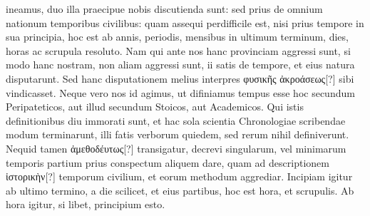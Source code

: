 ineamus, duo illa praecipue nobis discutienda sunt: sed prius
de omnium nationum temporibus civilibus: quam assequi perdifficile
est, nisi prius tempore in sua principia, hoc est ab annis, periodis,
mensibus in ultimum terminum, dies, horas ac scrupula resoluto.
Nam qui ante nos hanc provinciam aggressi sunt, si modo hanc nostram,
non aliam aggressi sunt, ii satis de tempore, et eius natura
disputarunt.
Sed hanc disputationem melius interpres
 \textgreek{φυσικῆς ἀκροάσεως[?]}
sibi vindicasset.
Neque vero nos id agimus, ut difiniamus
tempus esse hoc secundum Peripateticos, aut illud secundum Stoicos,
aut Academicos.
Qui istis definitionibus diu immorati sunt, et hac
sola scientia Chronologiae scribendae modum terminarunt, illi fatis
verborum quiedem, sed rerum nihil definiverunt.
%
Nequid tamen
\textgreek{ἀμεθοδέυτως[?]} transigatur, decrevi singularum, vel
 minimarum temporis
partium prius conspectum aliquem dare, quam ad descriptionem
\textgreek{ἱστορικὴν[?]} temporum civilium, et eorum methodum aggrediar.
Incipiam igitur ab ultimo termino, a die scilicet, et eius partibus,
hoc est hora, et scrupulis.
Ab hora igitur, si libet, principium esto.
